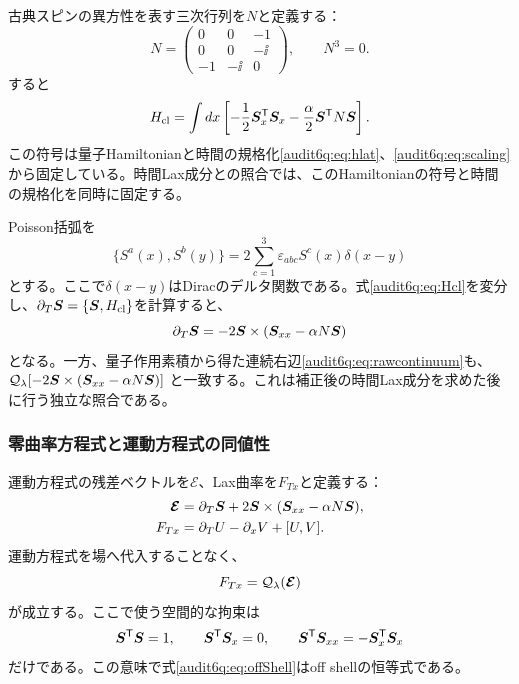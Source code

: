 古典スピンの異方性を表す三次行列を$N$と定義する：
\begin{equation}
N=\begin{pmatrix}0&0&-1\\0&0&-\ii\\-1&-\ii&0\end{pmatrix},\qquad N^3=0.
\label{audit6q:eq:N}
\end{equation}
すると
\begin{equation}
H_{\rm cl}=\int dx\left[-\frac12\boldsymbol S_x^{\mathsf T}\boldsymbol S_x
-\frac\alpha2\boldsymbol S^{\mathsf T}N\boldsymbol S\right].
\label{audit6q:eq:Hcl}
\end{equation}
この符号は量子Hamiltonianと時間の規格化\eqref{audit6q:eq:hlat}、\eqref{audit6q:eq:scaling}から固定している。時間Lax成分との照合では、このHamiltonianの符号と時間の規格化を同時に固定する。

Poisson括弧を
\begin{equation}
\{S^a(x),S^b(y)\}=2\sum_{c=1}^3\varepsilon_{abc}S^c(x)\delta(x-y)
\label{audit6q:eq:PB}
\end{equation}
とする。ここで$\delta(x-y)$はDiracのデルタ関数である。式\eqref{audit6q:eq:Hcl}を変分し、$\partial_T\boldsymbol S=\{\boldsymbol S,H_{\rm cl}\}$を計算すると、
\begin{equation}
\partial_T\boldsymbol S=-2\boldsymbol S\times(\boldsymbol S_{xx}-\alpha N\boldsymbol S)
\label{audit6q:eq:EOM}
\end{equation}
となる。一方、量子作用素積から得た連続右辺\eqref{audit6q:eq:rawcontinuum}も、
$\mathcal Q_{\lambda}[-2\boldsymbol S\times(\boldsymbol S_{xx}-\alpha N\boldsymbol S)]$
と一致する。これは補正後の時間Lax成分を求めた後に行う独立な照合である。

\subsubsection{零曲率方程式と運動方程式の同値性}
運動方程式の残差ベクトルを$\boldsymbol{\mathcal E}$、Lax曲率を$F_{Tx}$と定義する：
\begin{align}
\boldsymbol{\mathcal E}&=\partial_T\boldsymbol S+2\boldsymbol S\times(\boldsymbol S_{xx}-\alpha N\boldsymbol S),
\label{audit6q:eq:Eres}\\
F_{Tx}&=\partial_TU-\partial_xV+[U,V].
\label{audit6q:eq:curvature}
\end{align}
運動方程式を場へ代入することなく、
\begin{equation}
F_{Tx}=\mathcal Q_{\lambda}(\boldsymbol{\mathcal E})
\label{audit6q:eq:offShell}
\end{equation}
が成立する。ここで使う空間的な拘束は
\begin{equation}
\boldsymbol S^{\mathsf T}\boldsymbol S=1,\qquad
\boldsymbol S^{\mathsf T}\boldsymbol S_x=0,\qquad
\boldsymbol S^{\mathsf T}\boldsymbol S_{xx}=-\boldsymbol S_x^{\mathsf T}\boldsymbol S_x
\label{audit6q:eq:kinematic}
\end{equation}
だけである。この意味で式\eqref{audit6q:eq:offShell}はoff shellの恒等式である。

